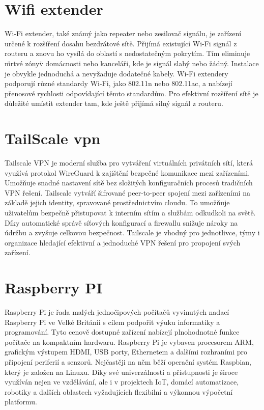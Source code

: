 \section{Wifi extender}\label{sec:wifi-extender}
Wi-Fi extender, také známý jako repeater nebo zesilovač signálu, je zařízení určené k rozšíření dosahu bezdrátové sítě. Přijímá existující Wi-Fi signál z routeru a znovu ho vysílá do oblastí s nedostatečným pokrytím. Tím eliminuje \"mrtvé zóny\" v domácnosti nebo kanceláři, kde je signál slabý nebo žádný. Instalace je obvykle jednoduchá a nevyžaduje dodatečné kabely. Wi-Fi extendery podporují různé standardy Wi-Fi, jako 802.11n nebo 802.11ac, a nabízejí přenosové rychlosti odpovídající těmto standardům. Pro efektivní rozšíření sítě je důležité umístit extender tam, kde ještě přijímá silný signál z routeru.


\section{TailScale vpn}\label{sec:tailscale}
Tailscale VPN je moderní služba pro vytváření virtuálních privátních sítí, která využívá protokol WireGuard k zajištění bezpečné komunikace mezi zařízeními. Umožňuje snadné nastavení sítě bez složitých konfiguračních procesů tradičních VPN řešení. Tailscale vytváří šifrované peer-to-peer spojení mezi zařízeními na základě jejich identity, spravované prostřednictvím cloudu. To umožňuje uživatelům bezpečně přistupovat k interním sítím a službám odkudkoli na světě. Díky automatické správě síťových konfigurací a firewallu snižuje nároky na údržbu a zvyšuje celkovou bezpečnost. Tailscale je vhodný pro jednotlivce, týmy i organizace hledající efektivní a jednoduché VPN řešení pro propojení svých zařízení.


\section{Raspberry PI}\label{sec:rpi}
Raspberry Pi je řada malých jednočipových počítačů vyvinutých nadací Raspberry Pi ve Velké Británii s cílem podpořit výuku informatiky a programování. Tyto cenově dostupné zařízení nabízejí plnohodnotné funkce počítače na kompaktním hardwaru. Raspberry Pi je vybaven procesorem ARM, grafickým výstupem HDMI, USB porty, Ethernetem a dalšími rozhraními pro připojení periferií a senzorů. Nejčastěji na něm běží operační systém Raspbian, který je založen na Linuxu. Díky své univerzálnosti a přístupnosti je široce využíván nejen ve vzdělávání, ale i v projektech IoT, domácí automatizace, robotiky a dalších oblastech vyžadujících flexibilní a výkonnou výpočetní platformu.


